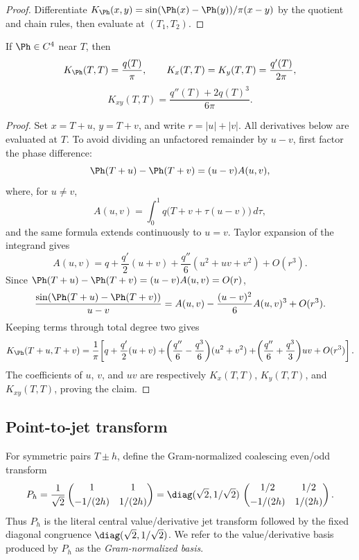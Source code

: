 \begin{proof}
Differentiate \(K_\Ph(x,y) = \sin(\Ph(x)-\Ph(y))/\pi(x-y)\) by the
quotient and chain rules, then evaluate at \((T_1, T_2)\).
\end{proof}

\begin{lemma}
\label{lem:phase-kernel-diagonal-derivatives}
If \(\Ph\in C^4\) near \(T\), then
\begin{equation}
\label{eq:diagonal-kernel-derivatives}
K_\Ph(T,T)=\frac{q(T)}{\pi},\qquad
K_x(T,T)=K_y(T,T)=\frac{q'(T)}{2\pi},
\end{equation}
\[
        K_{xy}(T,T)=\frac{q''(T)+2q(T)^3}{6\pi}.
\]
\end{lemma}

\begin{proof}
Set \(x=T+u\), \(y=T+v\), and write \(r=|u|+|v|\).  All derivatives
below are evaluated at \(T\).  To avoid dividing an unfactored remainder
by \(u-v\), first factor the phase difference:
\[
\Ph(T+u)-\Ph(T+v)=(u-v)A(u,v),
\]
where, for \(u\ne v\),
\[
A(u,v)=\int_0^1 q\bigl(T+v+\tau(u-v)\bigr)\,d\tau,
\]
and the same formula extends continuously to \(u=v\).  Taylor expansion
of the integrand gives
\[
A(u,v)
= q+\frac{q'}2(u+v)+\frac{q''}{6}(u^2+uv+v^2)+O(r^3).
\]
Since \(\Ph(T+u)-\Ph(T+v)=(u-v)A(u,v)=O(r)\),
\[
\frac{\sin(\Ph(T+u)-\Ph(T+v))}{u-v}
= A(u,v)-\frac{(u-v)^2}{6}A(u,v)^3+O(r^3).
\]
Keeping terms through total degree two gives
\[
K_\Ph(T+u,T+v)
= \frac1\pi\!\left[
 q + \frac{q'}{2}(u+v)
 + \!\left(\frac{q''}{6} - \frac{q^3}{6}\right)\!(u^2+v^2)
 + \!\left(\frac{q''}{6} + \frac{q^3}{3}\right)\!uv
 + O(r^3)\right].
\]
The coefficients of \(u\), \(v\), and \(uv\) are respectively
\(K_x(T,T)\), \(K_y(T,T)\), and \(K_{xy}(T,T)\), proving the claim.
\end{proof}

\subsection{Point-to-jet transform}
\label{subsec:point-to-jet-transform}

For symmetric pairs \(T\pm h\), define the Gram-normalized coalescing
even/odd transform
\begin{equation}
\label{eq:point-to-jet-transform}
P_h
=\frac1{\sqrt2}
\begin{pmatrix}
1 & 1\\[0.6ex]
-1/(2h) & 1/(2h)
\end{pmatrix}
=\diag(\sqrt 2, 1/\sqrt 2)\,
\begin{pmatrix}
1/2 & 1/2\\[0.6ex]
-1/(2h) & 1/(2h)
\end{pmatrix}.
\end{equation}
Thus \(P_h\) is the literal central value/derivative jet transform
followed by the fixed diagonal congruence
\(\diag(\sqrt 2, 1/\sqrt 2)\).  We refer to the value/derivative basis
produced by \(P_h\) as the \emph{Gram-normalized basis}.

